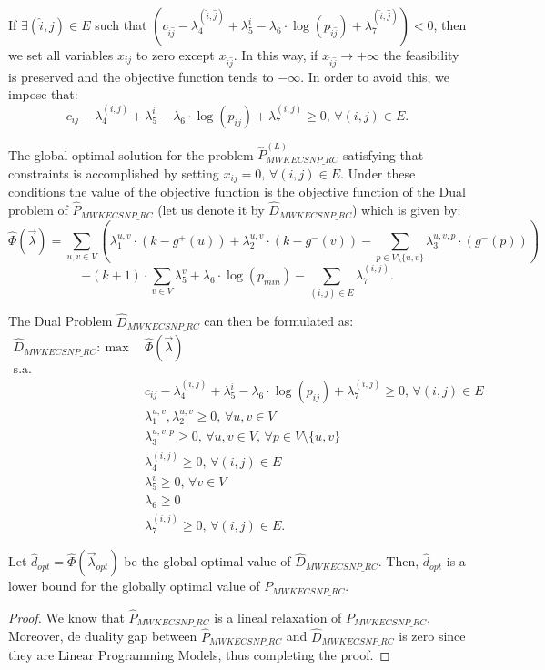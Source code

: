 If $\exists (\hat{i},\hat{j})\in E$ such that
$(c_{\hat{i}\hat{j}}-\lambda^{(\hat{i},\hat{j})}_{4}+\lambda^{\hat{i}}_{5}-\lambda_{6}\cdot
\log(p_{\hat{i}\hat{j}})+\lambda^{(\hat{i},\hat{j})}_{7})<0$, then
we set all variables $x_{ij}$ to zero except $x_{\hat{i}\hat{j}}$.
In this way, if $x_{\hat{i}\hat{j}}\rightarrow +\infty$ the
feasibility is preserved and the objective function tends to
$-\infty$. In order to avoid this, we impose that:
\[c_{ij}-\lambda^{(i,j)}_{4}+\lambda^{i}_{5}-\lambda_{6}\cdot \log(p_{ij})+\lambda^{(i,j)}_{7}\geq 0,\, \forall (i,j)\in
 E. \]

The global optimal solution for the problem
$\hat{P}^{(L)}_{MWKECSNP\_RC}$ satisfying that constraints is
accomplished by setting $x_{ij}=0,\,\forall (i,j)\in E$. Under
these conditions the value of the objective function is the
objective function of the Dual problem of $\hat{P}_{MWKECSNP\_RC}$
(let us denote it by $\hat{D}_{MWKECSNP\_RC}$) which is given by:
\[\hat{\Phi}(\vec{\lambda})=\sum_{u,v\in V} \left(\lambda^{u,v}_{1}\cdot (k-g^{+}(u))+\lambda^{u,v}_{2}\cdot (k-g^{-}(v))-\sum_{p\in V\setminus \{u,v\}} \lambda^{u,v,p}_{3}\cdot (g^{-}(p))\right) \]
\[-(k+1)\cdot \sum_{v\in V} \lambda^{v}_{5}+\lambda_{6}\cdot \log(p_{min})- \sum_{(i,j)\in E} \lambda^{(i,j)}_{7}. \]

The Dual Problem $\hat{D}_{MWKECSNP\_RC}$ can then be formulated
as:
\begin{align}
 \hat{D}_{MWKECSNP\_RC}:~ \mathrm{max}~~ & \hat{\Phi}(\vec{\lambda})    \nonumber\\
 \mathrm{s.a.} & \nonumber\\
 &                  c_{ij}-\lambda^{(i,j)}_{4}+\lambda^{i}_{5}-\lambda_{6}\cdot \log(p_{ij})+\lambda^{(i,j)}_{7}\geq 0,\, \forall (i,j)\in E & \nonumber &\\
 &                  \lambda^{u,v}_{1},\lambda^{u,v}_{2}\geq 0,\, \forall u,v\in V & \nonumber &\\
 &                   \lambda^{u,v,p}_{3}\geq 0,\, \forall u,v\in V,\, \forall p\in V\setminus \{u,v\}  & \nonumber &\\
 &                   \lambda^{(i,j)}_{4}\geq 0,\, \forall (i,j)\in E  & \nonumber &\\
 &                   \lambda^{v}_{5}\geq 0,\, \forall v\in V  & \nonumber &\\
 &                   \lambda_{6}\geq 0  & \nonumber &\\
 &                   \lambda^{(i,j)}_{7}\geq 0,\, \forall (i,j)\in E.  & \nonumber &
\end{align}
\begin{theorem} Let $\hat{d}_{opt}=\hat{\Phi}(\vec{\lambda}_{opt})$ be the
global optimal value of $\hat{D}_{MWKECSNP\_RC}$. Then,
$\hat{d}_{opt}$ is a lower bound for the globally optimal value of
$P_{MWKECSNP\_RC}$.
\end{theorem}
\begin{proof} We know that $\hat{P}_{MWKECSNP\_RC}$ is a lineal
relaxation of $P_{MWKECSNP\_RC}$. Moreover, de duality gap between
$\hat{P}_{MWKECSNP\_RC}$ and $\hat{D}_{MWKECSNP\_RC}$ is zero
since they are Linear Programming Models, thus completing the
proof.\end{proof}

